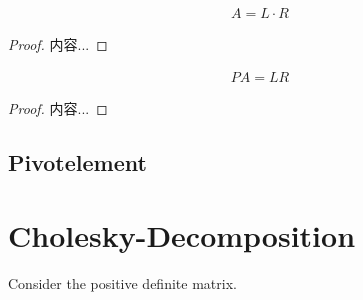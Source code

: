 \documentclass[Total.tex]{subfiles}
\begin{document}
				\begin{corollary}
					\begin{gather*}
						A=L\cdot R
					\end{gather*}
				\end{corollary}
				\begin{proof}
					内容...
				\end{proof}
				
				\begin{corollary}
					\begin{gather*}
						PA=LR
					\end{gather*}
				\end{corollary}
				\begin{proof}
					内容...
				\end{proof}
			\subsection{Pivotelement}
			
		\section{Cholesky-Decomposition}
			Consider the positive definite matrix.
			
\end{document}
